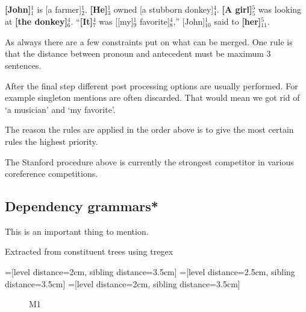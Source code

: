 \documentclass[12pt]{article}
\begin{document}
\begin{description}
\textbf{[John]$_1^1$} is [a farmer]$_2^1$. \textbf{[He]$_3^1$} owned [a stubborn donkey]$_4^4$.\newline
\textbf{[A girl]$_5^5$} was looking at \textbf{[the donkey]$_6^4$}.\newline
``\textbf{[It]$_7^4$} was [[my]$_9^1$ favorite]$_8^4$,'' [John]$_{10}^1$ said to \textbf{[her]$_{11}^{5}$}.

As always there are a few constraints put on what can be merged. One rule is that the distance between pronoun and antecedent must be maximum 3 sentences.
\end{description}

After the final step different post processing options are usually performed. For example singleton mentions are often discarded. That would mean we got rid of `a musician' and `my favorite'.

The reason the rules are applied in the order above is to give the most certain rules the highest priority.

The Stanford procedure above is currently the strongest competitor in various coreference competitions.

\subsection{Dependency grammars*}

This is an important thing to mention.

Extracted from constituent trees using tregex\cite{de2006generating}

=[level distance=2cm, sibling distance=3.5cm]
=[level distance=2.5cm, sibling distance=3.5cm]
=[level distance=2cm, sibling distance=3.5cm]
\begin{figure}
\centering
{}
\caption{M1} \label{fig:M1}
\end{figure}
\end{document}
